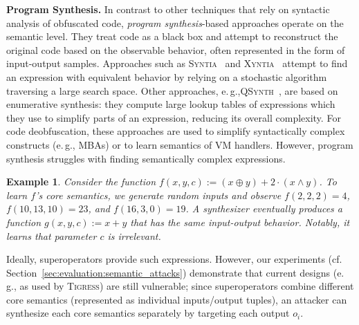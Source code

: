\documentclass[letterpaper,twocolumn,10pt]{article}
\newcommand{\eg}{e.\,g.,\xspace}
\newcommand{\cf}{cf.\xspace}
\theoremstyle{customexample}
\newtheorem{example}{Example}
\theoremstyle{customexperiment}
\newcommand{\qsynth}{\textsc{QSynth}\xspace}
\newcommand{\xyntia}{\textsc{Xyntia}\xspace}
\newcommand{\syntia}{\textsc{Syntia}\xspace}
\newcommand{\tigress}{\textsc{Tigress}\xspace}
\begin{document}
\textbf{Program Synthesis.}\label{paragraph:program_synthesis}
In contrast to other techniques that rely on syntactic analysis of obfuscated code, \emph{program synthesis}-based approaches operate on the semantic level. They treat code as a black box and attempt to reconstruct the original code based on the observable behavior, often represented in the form of input-output samples. Approaches such as \syntia~\cite{blazytko2017syntia} and \xyntia~\cite{menguy2021xyntia} attempt to find an expression with equivalent behavior by relying on a stochastic algorithm traversing a large search space. Other approaches, \eg \qsynth~\cite{david2020qsynth}, are based on enumerative synthesis: they compute large lookup tables of expressions which they use to simplify parts of an expression, reducing its overall complexity.
For code deobfuscation, these approaches are used to simplify syntactically complex constructs (\eg MBAs) or to learn  semantics of VM handlers. 
However, program synthesis struggles with finding semantically complex expressions. 
\begin{example}
Consider the function $f(x,y, c) := (x \oplus y) + 2 \cdot (x \land y)$. To learn $f$'s core semantics, we generate
random inputs and observe $f(2, 2, 2) = 4$, $f(10, 13, 10) = 23$, and $f(16, 3, 0) = 19$. A synthesizer eventually produces a function $g(x, y, c) :=  x + y$ that has the same input-output behavior. Notably, it learns that parameter $c$ is irrelevant.
\end{example}

Ideally, superoperators provide such expressions. However, our experiments (\cf Section~\ref{sec:evaluation:semantic_attacks}) demonstrate that current designs (\eg as used by \tigress) are still vulnerable; since superoperators combine different core semantics (represented as individual inputs/output tuples), an attacker can synthesize each core semantics separately by targeting each output $o_i$.
\end{document}
